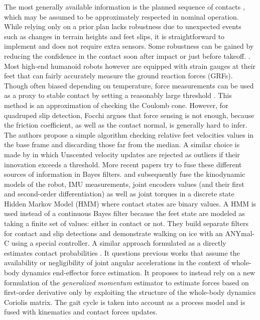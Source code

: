 The most generally available information is the planned sequence of contacts \cite{bledt2018contact}, which may be assumed to be approximately respected in nominal operation. 
While relying only on a prior plan lacks robustness due to unexpected events such as changes in terrain heights and feet slips, it is straightforward to implement and 
does not require extra sensors. Some robustness can be gained by reducing the confidence in the contact soon after impact or just before takeoff. 
\cite{leziart2021implementation, bledt2018contact}. Most high-end humanoid robots however \cite{stasse2017talos, englsberger2014overview} are 
equipped with strain gauges at their feet that can fairly accurately measure the ground reaction forces (GRFs). 
Though often biased depending on temperature, force measurements can be used as a proxy to stable contact by setting a reasonably large threshold \cite{fallon2014drift}. 
This method is an approximation of checking the Coulomb cone.
However, for quadruped slip detection, Focchi \cite{Focchi2015SlipDA} argues that force sensing is not enough, because the friction coefficient,
as well as the contact normal, is generally hard to infer. The authors propose a simple algorithm checking relative feet velocities values in the base frame and discarding those
far from the median. A similar choice is made by \cite{bloesch2013stateSlippery} in which Unscented \KalmanF velocity updates are rejected as outliers if their innovation exceeds a threshold.  
More recent papers try to fuse these different sources of information in Bayes filters. \cite{hwangbo2016probabilistic} and subsequently \cite{jenelten2019dynamic} fuse 
the kinodynamic models of the robot, IMU measurements, joint encoders values (and their first and second-order differentiation) as well as
joint torques in a discrete state Hidden Markov Model (HMM) where contact states are binary values. A HMM is used instead of a continuous Bayes filter because the feet state are modeled as taking a finite set of values: either in contact or not.
They build separate filters for contact and slip detections and demonstrate walking on ice with an 
\mbox{ANYmal-C} using a special controller. A similar approach formulated as a \KalmanF directly estimates contact probabilities \cite{bledt2018contact}. 
It questions previous works that assume the availability  \cite{hwangbo2016probabilistic} or negligibility \cite{camurri2017probabilistic} of joint angular 
accelerations in the context of whole-body dynamics end-effector force estimation.
It proposes to instead rely on a new formulation of the \textit{generalized momentum} estimator to estimate forces based on first-order derivative only by exploiting the 
structure of the whole-body dynamics Coriolis matrix. The gait cycle is taken into account as a process model and is fused with kinematics and contact forces updates.  

